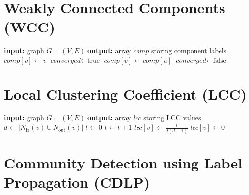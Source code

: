\clearpage

\section{Weakly Connected Components (WCC)}

\begin{algorithm}[h!]
\begin{algorithmic}[1]
\Statex \textbf{input:} graph $G=(V,E)$
\Statex \textbf{output:} array $\textit{comp}$ storing component labels
  \State $\textit{comp}[v] \gets v$
\EndFor
\Repeat
\State $\textit{converged} \gets \text{true}$
      \State $\textit{comp}[v] \gets \textit{comp}[u]$
      \State $\textit{converged} \gets \text{false}$
     \EndIf
  \EndFor
\EndFor
{}
\end{algorithmic}
\end{algorithm}


\section{Local Clustering Coefficient (LCC)}

\begin{algorithm}[h!]
\begin{algorithmic}[1]
\Statex \textbf{input:} graph $G=(V,E)$
\Statex \textbf{output:} array $\textit{lcc}$ storing LCC values
   \State $d \gets |N_\mathrm{in}(v) \cup N_\mathrm{out}(v)|$
  \State $t \gets 0$
      \State $t  \gets t + 1$
     \EndIf
    \EndFor
  \EndFor
    \State $\textit{lcc}[v] \gets \frac{t}{d(d-1)} $
  \Else
    \State $\textit{lcc}[v] \gets 0$
  \EndIf
\EndFor
\end{algorithmic}
\end{algorithm}

\clearpage

\section{Community Detection using Label Propagation (CDLP)}

